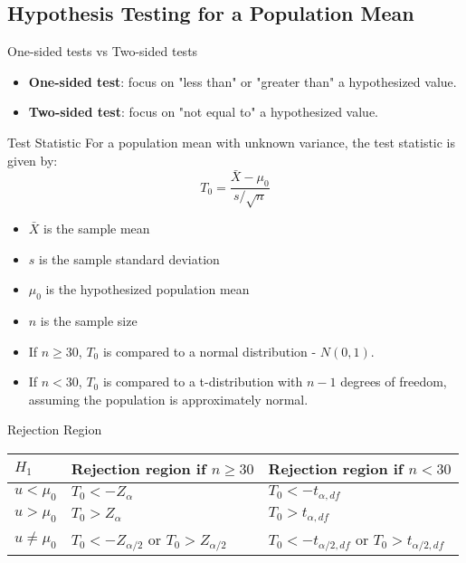 \documentclass[9pt]{extarticle}
\begin{document}
\subsection{Hypothesis Testing for a Population Mean}
\begin{definitionbox}{One-sided tests vs Two-sided tests}{}
    \begin{itemize}
        \item \textbf{One-sided test}: focus on "less than" or "greater than" a hypothesized value. 
        \item \textbf{Two-sided test}: focus on "not equal to" a hypothesized value.
    \end{itemize}
\end{definitionbox}
\begin{definitionbox}{Test Statistic}{}
    For a population mean with unknown variance, the test statistic is given by:
    $$T_0 = \frac{\bar{X} - \mu_0}{s/\sqrt{n}}$$
    \begin{itemize}
        \item $\bar{X}$ is the sample mean
        \item $s$ is the sample standard deviation
        \item $\mu_0$ is the hypothesized population mean
        \item $n$ is the sample size
    \end{itemize}
    \begin{itemize}
        \item If $n \geq 30$,  $T_0$ is compared to a normal distribution - $N(0, 1)$.
        \item If $n < 30$, $T_0$ is compared to a t-distribution with $n-1$ degrees of freedom, assuming the population is approximately normal.
    \end{itemize}
\end{definitionbox}


\begin{definitionbox}{Rejection Region}{}
        \centering
        \begin{tabularx}{\textwidth}{@{} X X X @{}}
            \toprule
            $H_1$ & Rejection region if $n \geq 30$ & Rejection region if $n < 30$ \\
            \midrule
            $u < \mu _0$ & $T_0 < -Z_{\alpha}$ & $T_0 < -t_{\alpha, df}$ \\
            \addlinespace[2ex]
            $u > \mu _0$ & $T_0 > Z_{\alpha}$ & $T_0 > t_{\alpha, df}$ \\
            \addlinespace[2ex]
            $u \neq \mu _0$ & $T_0 < -Z_{\alpha/2}$ or $T_0 > Z_{\alpha/2}$ & $T_0 < -t_{\alpha/2, df}$ or $T_0 > t_{\alpha/2, df}$ \\
            \bottomrule
        \end{tabularx}
\end{definitionbox}
\end{document}
